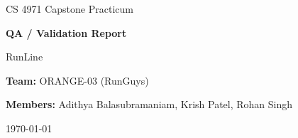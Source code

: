 \documentclass[10pt,letterpaper]{article}
\newcommand{\projectname}{RunLine}
\newcommand{\teamname}{ORANGE-03 (RunGuys)}
\newcommand{\teammembers}{Adithya Balasubramaniam, Krish Patel, Rohan Singh}
\newcommand{\reportdate}{\today}
\begin{document}
\begin{titlepage}
  \centering
  \vspace*{1.5in}
  {\Large CS 4971 Capstone Practicum\par}
  \vspace{0.35in}
  {\huge\bfseries QA / Validation Report\par}
  \vspace{0.45in}
  {\LARGE \projectname\par}
  \vspace{0.75in}
  {\large \textbf{Team:} \teamname\par}
  \vspace{0.12in}
  {\large \textbf{Members:} \teammembers\par}
  \vfill
  {\large \reportdate\par}
\end{titlepage}

\setcounter{page}{1}









\appendix

\end{document}
